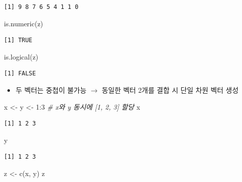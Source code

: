 \documentclass[
  11pt,
]{krantz}
\newenvironment{Shaded}{\begin{snugshade}}{\end{snugshade}}
\newcommand{\CommentTok}[1]{\textcolor[rgb]{0.37,0.37,0.37}{\textit{#1}}}
\newcommand{\DecValTok}[1]{\textcolor[rgb]{0.06,0.06,0.06}{#1}}
\newcommand{\FunctionTok}[1]{\textcolor[rgb]{0,0,0}{#1}}
\newcommand{\NormalTok}[1]{#1}
\newcommand{\OtherTok}[1]{\textcolor[rgb]{0.37,0.37,0.37}{#1}}
\newcommand{\SpecialCharTok}[1]{\textcolor[rgb]{0,0,0}{#1}}
\providecommand{\tightlist}{%
  \setlength{\itemsep}{0pt}\setlength{\parskip}{0pt}}
\begin{document}
\begin{verbatim}
[1] 9 8 7 6 5 4 1 1 0
\end{verbatim}

\begin{Shaded}
\begin{Highlighting}[]
\FunctionTok{is.numeric}\NormalTok{(z)}
\end{Highlighting}
\end{Shaded}

\begin{verbatim}
[1] TRUE
\end{verbatim}

\begin{Shaded}
\begin{Highlighting}[]
\FunctionTok{is.logical}\NormalTok{(z)}
\end{Highlighting}
\end{Shaded}

\begin{verbatim}
[1] FALSE
\end{verbatim}

\normalsize

\begin{itemize}
\tightlist
\item
  두 벡터는 중첩이 불가능 \(\rightarrow\) 동일한 벡터 2개를 결합 시 단일 차원 벡터 생성
\end{itemize}

\footnotesize

\begin{Shaded}
\begin{Highlighting}[]
\NormalTok{x }\OtherTok{\textless{}{-}}\NormalTok{ y }\OtherTok{\textless{}{-}} \DecValTok{1}\SpecialCharTok{:}\DecValTok{3} \CommentTok{\# x와 y 동시에 [1, 2, 3] 할당}
\NormalTok{x }
\end{Highlighting}
\end{Shaded}

\begin{verbatim}
[1] 1 2 3
\end{verbatim}

\begin{Shaded}
\begin{Highlighting}[]
\NormalTok{y}
\end{Highlighting}
\end{Shaded}

\begin{verbatim}
[1] 1 2 3
\end{verbatim}

\begin{Shaded}
\begin{Highlighting}[]
\NormalTok{z }\OtherTok{\textless{}{-}} \FunctionTok{c}\NormalTok{(x, y)}
\NormalTok{z}
\end{Highlighting}
\end{Shaded}
\end{document}

